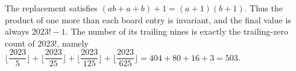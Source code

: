The replacement satisfies $(ab+a+b)+1=(a+1)(b+1)$. Thus the product of one more than each board entry is invariant, and the final value is always $2023!-1$. The number of its trailing nines is exactly the trailing-zero count of $2023!$, namely $\lfloor\dfrac{2023}{5}\rfloor+\lfloor\dfrac{2023}{25}\rfloor+\lfloor\dfrac{2023}{125}\rfloor+\lfloor\dfrac{2023}{625}\rfloor=404+80+16+3=\boxed{503}$.
